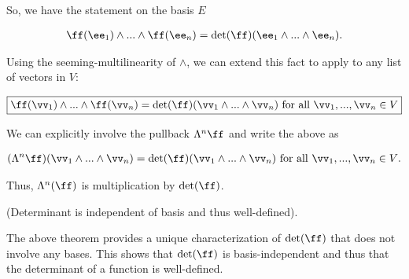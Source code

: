\begin{theorem}
   So, we have the statement on the basis $E$
   
   \begin{align*}
        \ff(\ee_1) \wedge ... \wedge 
        \ff(\ee_n) = \det(\ff) (\ee_1 \wedge ... \wedge \ee_n).
   \end{align*}
   
   Using the seeming-multilinearity of $\wedge$, we can extend this fact to apply to any list of vectors in $V$:
   
   \begin{align*}
       \boxed
       {
        \ff(\vv_1) \wedge ... \wedge \ff(\vv_n) = \det(\ff) ( \vv_1 \wedge ... \wedge \vv_n ) \text{ for all $\vv_1, ..., \vv_n \in V$}
       }
   \end{align*}
   
   We can explicitly involve the pullback $\Lambda^n \ff$ and write the above as
   
   \begin{align*}
       (\Lambda^n \ff)(\vv_1 \wedge ... \wedge \vv_n) = \det(\ff) ( \vv_1 \wedge ... \wedge \vv_n ) \text{ for all $\vv_1, ..., \vv_n \in V$}.
   \end{align*}
   
   Thus, $\Lambda^n(\ff)$ is multiplication by $\det(\ff)$.
\end{theorem}

\begin{remark}
\label{ch::exterior_pwrs::rmk::det_basis_invariant}

    (Determinant is independent of basis and thus well-defined).
    
    The above theorem provides a unique characterization of $\det(\ff)$ that does not involve any bases. This shows that $\det(\ff)$ is basis-independent and thus that the determinant of a function is well-defined.
\end{remark}

